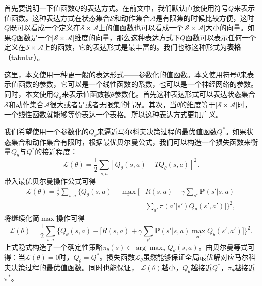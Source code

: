 首先要说明一下值函数$Q$的表达方式。在前文中，我们默认直接使用符号$Q$来表示值函数。这种表达方式在状态集合$\mathcal{S}$和动作集合$\mathcal{A}$是有限集的时候比较方便，这时$Q$既可以看成一个定义在$\mathcal{S}\times\mathcal{A}$上的值函数也可以看成一个$\vert\mathcal{S}\times\mathcal{A}\vert$大小的向量。如果$Q$函数是一个$\vert\mathcal{S}\times\mathcal{A}\vert$维度的向量，那么这种表达方式下$Q$函数可以表示任何一个定义在$\mathcal{S}\times\mathcal{A}$上的函数，它的表达形式是最丰富的。我们也称这种形式为\textbf{表格}（tabular）。

这里，本文使用一种更一般的表达形式——参数化的值函数。本文使用符号$\theta$来表示值函数的参数，它可以是一个线性函数的系数，也可以是一个神经网络的参数。同时，本文使用$Q_{\theta}$来表示值函数被$\theta$参数化。首先这种表达形式可以表达状态集合$\mathcal{S}$和动作集合$\mathcal{A}$很大或者是或者无限集的情况。其次，当$\theta$的维度等于$\vert \mathcal{S}\times\mathcal{A}\vert$时，一个线性函数就能够等价表达一个表格。所以这种表达方式更加广义。

我们希望使用一个参数化的$Q_\theta$来逼近马尔科夫决策过程的最优值函数$Q^*$。如果状态集合和动作集合有限时，根据最优贝尔曼公式，我们可以构造一个损失函数来衡量$Q_\theta$与$Q^*$的接近程度：
\begin{equation}
    \mathcal{L}(\theta) = \frac{1}{2}\sum_{s, a} [ Q_\theta(s, a) 
    - TQ_\theta(s, a) ]^2.
\end{equation}
带入最优贝尔曼操作公式可得
\begin{equation}
    \begin{aligned}
    \mathcal{L}(\theta) = \frac{1}{2}\sum_{s, a} \bigg\{ Q_\theta(s, a)
    - \max_{\pi} \bigg[&R(s, a) + \gamma \sum_{s'}\mathbf{P}(s' \vert s, a)\\
    &\sum_{a'}\pi(a' \vert s') Q_\theta(s', a')\bigg]\bigg\}^2,
    \end{aligned}
\end{equation}
将继续化简$\max$操作可得
\begin{equation}\label{equ:original-q-loss}
    \mathcal{L}(\theta) = \frac{1}{2}\sum_{s, a} \bigg\{ Q_\theta(s, a)
    - \bigg[R(s, a) + \gamma \sum_{s'}\mathbf{P}(s' \vert s, a)
    \max_{a'} Q_\theta(s', a')\bigg]\bigg\}^2.
\end{equation}
上式隐式构造了一个确定性策略$\pi_\theta(s) \in \arg\max_a Q_\theta(s, a)$。由贝尔曼等式可得：当$\mathcal{L}(\theta) = 0$时，$Q_\theta = Q^*$。损失函数$\mathcal{L}_\theta$虽然能够保证全局最优解对应马尔科夫决策过程的最优值函数。同时也能保证， $\mathcal{L}(\theta)$越小，$Q_\theta$越接近$Q^*$，$\pi_\theta$越接近$\pi^*$。

